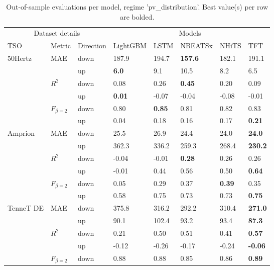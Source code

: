 \begin{table}
\caption{Out-of-sample evaluations per model, regime 'pv_distribution'. Best value(s) per row are bolded.}
\begin{tabular}{llllllll}
\toprule
\multicolumn{3}{c}{Dataset details} & \multicolumn{5}{c}{Models} \\
\cmidrule(lr){1-3}\cmidrule(lr){4-8}
TSO & Metric & Direction & LightGBM & LSTM & NBEATSx & NHiTS & TFT \\
\midrule
\multirow[t]{6}{*}{50Hertz} & \multirow[t]{2}{*}{MAE} & down & 187.9 & 194.7 & \textbf{157.6} & 182.1 & 191.1 \\
 &  & up & \textbf{6.0} & 9.1 & 10.5 & 8.2 & 6.5 \\
\cline{2-8}
 & \multirow[t]{2}{*}{$R^2$} & down & 0.08 & 0.26 & \textbf{0.45} & 0.20 & 0.09 \\
 &  & up & \textbf{0.01} & -0.07 & -0.04 & -0.08 & -0.01 \\
\cline{2-8}
 & \multirow[t]{2}{*}{$F_{\beta=2}$} & down & 0.80 & \textbf{0.85} & 0.81 & 0.82 & 0.83 \\
 &  & up & 0.04 & 0.18 & 0.16 & 0.17 & \textbf{0.21} \\
\cline{1-8} \cline{2-8}
\multirow[t]{6}{*}{Amprion} & \multirow[t]{2}{*}{MAE} & down & 25.5 & 26.9 & 24.4 & 24.0 & \textbf{24.0} \\
 &  & up & 362.3 & 336.2 & 259.3 & 268.4 & \textbf{230.2} \\
\cline{2-8}
 & \multirow[t]{2}{*}{$R^2$} & down & -0.04 & -0.01 & \textbf{0.28} & 0.26 & 0.26 \\
 &  & up & -0.01 & 0.44 & 0.56 & 0.50 & \textbf{0.64} \\
\cline{2-8}
 & \multirow[t]{2}{*}{$F_{\beta=2}$} & down & 0.05 & 0.29 & 0.37 & \textbf{0.39} & 0.35 \\
 &  & up & 0.58 & 0.75 & 0.73 & 0.73 & \textbf{0.75} \\
\cline{1-8} \cline{2-8}
\multirow[t]{6}{*}{TenneT DE} & \multirow[t]{2}{*}{MAE} & down & 375.8 & 316.2 & 292.2 & 310.4 & \textbf{271.0} \\
 &  & up & 90.1 & 102.4 & 93.2 & 93.4 & \textbf{87.3} \\
\cline{2-8}
 & \multirow[t]{2}{*}{$R^2$} & down & 0.21 & 0.50 & 0.51 & 0.41 & \textbf{0.57} \\
 &  & up & -0.12 & -0.26 & -0.17 & -0.24 & \textbf{-0.06} \\
\cline{2-8}
 & \multirow[t]{2}{*}{$F_{\beta=2}$} & down & 0.88 & 0.88 & 0.85 & 0.86 & \textbf{0.89} \\

\end{tabular}
\end{table}
